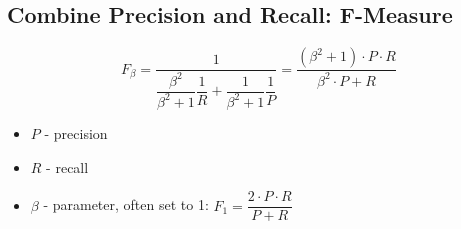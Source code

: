 \subsection{Combine Precision and Recall: F-Measure}

\begin{equation*}
F_\beta = \frac{1}{\dfrac{\beta^2}{\beta^2+1}\dfrac{1}{R} + \dfrac{1}{\beta^2+1}\dfrac{1}{P}} = \frac{(\beta^2+1)\cdot P \cdot R}{\beta^2 \cdot P + R}
\end{equation*}

\begin{itemize}
\item $P$ - precision
\item $R$ - recall
\item $\beta$ - parameter, often set to 1: $F_1 = \dfrac{2 \cdot P \cdot R}{P+R}$
\end{itemize}
